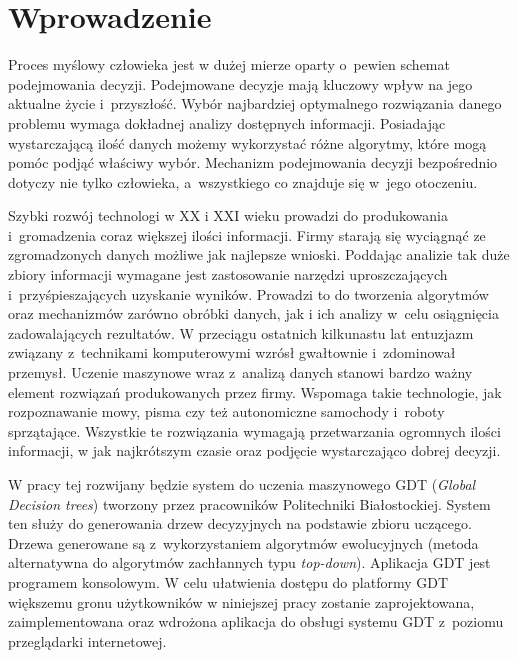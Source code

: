 \chapter*{Wprowadzenie}
Proces myślowy człowieka jest w dużej mierze oparty o~pewien schemat podejmowania decyzji. Podejmowane decyzje mają kluczowy wpływ na jego aktualne życie i~przyszłość. Wybór najbardziej optymalnego rozwiązania danego problemu wymaga dokładnej analizy dostępnych informacji. Posiadając wystarczającą ilość danych możemy wykorzystać różne algorytmy, które mogą pomóc podjąć właściwy wybór. Mechanizm podejmowania decyzji bezpośrednio dotyczy nie tylko człowieka, a~wszystkiego co znajduje się w~jego otoczeniu. 

Szybki rozwój technologi w XX i XXI wieku prowadzi do produkowania i~gromadzenia coraz większej ilości informacji. Firmy starają się wyciągnąć ze zgromadzonych danych możliwe jak najlepsze wnioski. Poddając analizie tak duże zbiory informacji wymagane jest zastosowanie narzędzi uproszczających i~przyśpieszających uzyskanie wyników. Prowadzi to do tworzenia algorytmów oraz mechanizmów zarówno obróbki danych, jak i ich analizy w~celu osiągnięcia zadowalających rezultatów. W przeciągu ostatnich kilkunastu lat entuzjazm związany z~technikami komputerowymi wzrósł gwałtownie i~zdominował przemysł. Uczenie maszynowe wraz z~analizą danych stanowi bardzo ważny element rozwiązań produkowanych przez firmy. Wspomaga takie technologie, jak rozpoznawanie mowy, pisma czy też autonomiczne samochody i~roboty sprzątające. Wszystkie te rozwiązania wymagają przetwarzania ogromnych ilości informacji, w jak najkrótszym czasie oraz podjęcie wystarczająco dobrej decyzji.

W pracy tej rozwijany będzie system do uczenia maszynowego GDT (\textit{Global Decision trees})\cite{sgdt_1} tworzony przez pracowników Politechniki Białostockiej. System ten służy do generowania drzew decyzyjnych na podstawie zbioru uczącego. Drzewa generowane są z~wykorzystaniem algorytmów ewolucyjnych (metoda alternatywna do algorytmów zachłannych typu \textit{top-down}). Aplikacja GDT jest programem konsolowym. W celu ułatwienia dostępu do platformy GDT większemu gronu użytkowników w niniejszej pracy zostanie zaprojektowana, zaimplementowana oraz wdrożona aplikacja do obsługi systemu GDT z~poziomu przeglądarki internetowej.  


